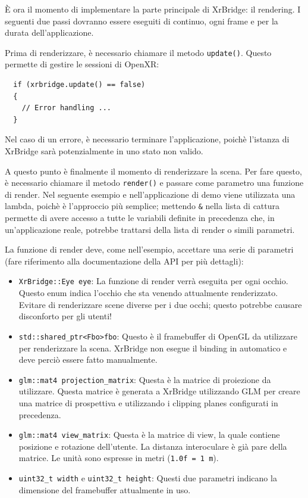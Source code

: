 \documentclass[twoside]{supsistudent}
\begin{document}
È ora il momento di implementare la parte principale di XrBridge: il rendering. I seguenti due passi dovranno essere eseguiti di continuo, ogni frame e per la durata dell'applicazione.

Prima di renderizzare, è necessario chiamare il metodo \texttt{update()}. Questo permette di gestire le sessioni di OpenXR:

\begin{verbatim}
  if (xrbridge.update() == false)
  {
    // Error handling ...
  }
\end{verbatim}

Nel caso di un errore, è necessario terminare l'applicazione, poichè l'istanza di XrBridge sarà potenzialmente in uno stato non valido.

A questo punto è finalmente il momento di renderizzare la scena. Per fare questo, è necessario chiamare il metodo \texttt{render()} e passare come parametro una funzione di render. Nel seguente esempio e nell'applicazione di demo viene utilizzata una lambda, poichè è l'approccio più semplice; mettendo \texttt{\&} nella lista di cattura permette di avere accesso a tutte le variabili definite in precedenza che, in un'applicazione reale, potrebbe trattarsi della lista di render o simili parametri.

La funzione di render deve, come nell'esempio, accettare una serie di parametri (fare riferimento alla documentazione della API per più dettagli):

\begin{itemize}
  \item \texttt{XrBridge::Eye eye}: La funzione di render verrà eseguita per ogni occhio. Questo enum indica l'occhio che sta venendo attualmente renderizzato. Evitare di renderizzare scene diverse per i due occhi; questo potrebbe causare disconforto per gli utenti!
  \item \texttt{std::shared\_ptr<Fbo>fbo}: Questo è il framebuffer di OpenGL da utilizzare per renderizzare la scena. XrBridge non esegue il binding in automatico e deve perciò essere fatto manualmente.
  \item \texttt{glm::mat4 projection\_matrix}: Questa è la matrice di proiezione da utilizzare. Questa matrice è generata a XrBridge utilizzando GLM per creare una matrice di prospettiva e utilizzando i clipping planes configurati in precedenza.
  \item \texttt{glm::mat4 view\_matrix}: Questa è la matrice di view, la quale contiene posizione e rotazione dell'utente. La distanza interoculare è già pare della matrice. Le unità sono espresse in metri (\texttt{1.0f = 1 m}).
  \item \texttt{uint32\_t width} e \texttt{uint32\_t height}: Questi due parametri indicano la dimensione del framebuffer attualmente in uso.
\end{itemize}
\end{document}
